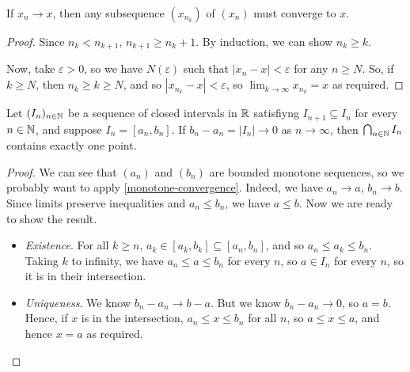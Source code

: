 \documentclass{../template/note}
\begin{document}
    \begin{lemma}
        If \(x_n \to x\), then any subsequence \((x_{n_k})\) of \((x_n)\) must converge to \(x\).
    \end{lemma}
    
    \begin{proof}
        Since \(n_k < n_{k+1}\), \(n_{k+1} \geq n_k + 1\). By induction, we can show \(n_k \geq k\).

        Now, take \(\varepsilon > 0\), so we have \(N(\varepsilon)\) such that \(|x_n-x| < \varepsilon\) for any \(n \geq N\). So, if \(k \geq N\), then \(n_k \geq k \geq N\), and so \(|x_{n_k}-x|<\varepsilon\), so \(\lim_{k \to \infty}x_{n_k} = x\) as required.
    \end{proof}
    
    \begin{proposition}
        \label{nested-interval}
        Let \((I_n)_{n \in \mathbb N}\) be a sequence of closed intervals in \(\mathbb R\) satisfiyng \(I_{n+1} \subseteq I_n\) for every \(n \in \mathbb N\), and suppose \(I_n = [a_n, b_n]\). If \(b_n - a_n = |I_n| \to 0\) as \(n \to \infty\), then \(\bigcap_{n \in \mathbb N} I_n\) contains exactly one point.
    \end{proposition}
    
    \begin{proof}
        We can see that \((a_n)\) and \((b_n)\) are bounded monotone sequences, so we probably want to apply \cref{monotone-convergence}. Indeed, we have \(a_n \to a\), \(b_n \to b\). Since limits preserve inequalities and \(a_n \leq b_n\), we have \(a \leq b\). Now we are ready to show the result.
        \begin{itemize}
            \item \emph{Existence}. For all \(k \geq n\), \(a_k \in [a_k, b_k] \subseteq [a_n, b_n]\), and so \(a_n \leq a_k \leq b_n\). Taking \(k\) to infinity, we have \(a_n \leq a \leq b_n\) for every \(n\), so \(a \in I_n\) for every \(n\), so it is in their intersection.
            \item \emph{Uniqueness}. We know \(b_n - a_n \to b - a\). But we know \(b_n - a_n \to 0\), so \(a = b\). Hence, if \(x\) is in the intersection, \(a_n \leq x \leq b_n\) for all \(n\), so \(a \leq x \leq a\), and hence \(x=a\) as required.
        \end{itemize}
    \end{proof}
    
\end{document}

